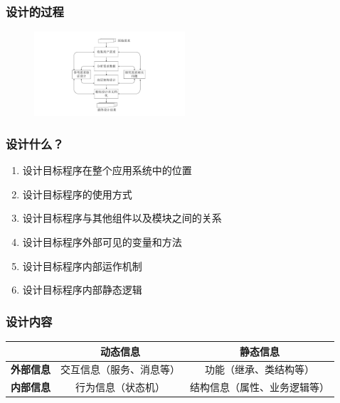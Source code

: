 \subsubsection{设计的过程}
\begin{figure}[H]
    \vspace{-0.5em}
	\centering
	\includegraphics[width=0.5\textwidth]{images/PSP设计过程.pdf}
    \vspace{-1em}
\end{figure}

\subsubsection{设计什么？}
\vspace{-0.8em}
\begin{multicols}{2}
    \begin{enumerate}[label=\arabic*.]
        \item 设计目标程序在整个应用系统中的位置
        \item 设计目标程序的使用方式
        \item 设计目标程序与其他组件以及模块之间的关系
        \item 设计目标程序外部可见的变量和方法
        \item 设计目标程序内部运作机制
        \item 设计目标程序内部静态逻辑
    \end{enumerate}
\end{multicols}
\vspace{-1em}

\subsubsection{设计内容}
\vspace{-0.5em}
\begin{table}[H]
    \centering
    \begin{tabular}{|c|c|c|}
    \hline
                  & \textbf{动态信息} & \textbf{静态信息}  \\ \hline
    \textbf{外部信息} & 交互信息（服务、消息等）  & 功能（继承、类结构等）    \\ \hline
    \textbf{内部信息} & 行为信息（状态机）     & 结构信息（属性、业务逻辑等） \\ \hline
    \end{tabular}
\end{table}
\vspace{-1em}

